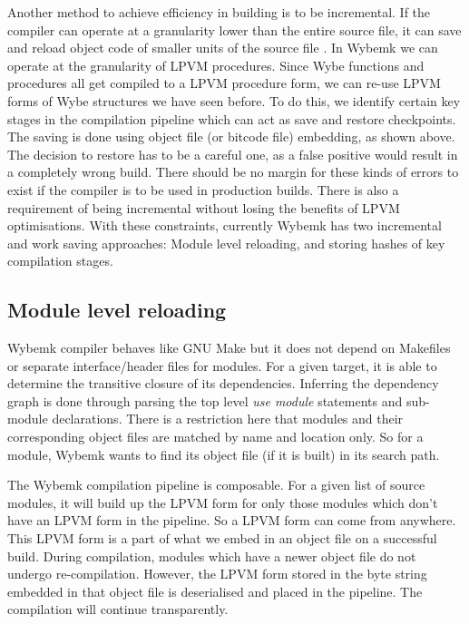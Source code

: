 Another method to achieve efficiency in building is to be incremental. If the
compiler can operate at a granularity lower than the entire source file, it can
save and reload object code of smaller units of the source file
\citep{cpp_compiler}. In Wybemk we can operate at the granularity of LPVM
procedures. Since Wybe functions and procedures all get compiled to a LPVM
procedure form, we can re-use LPVM forms of Wybe structures we have seen
before. To do this, we identify certain key stages in the compilation pipeline
which can act as save and restore checkpoints. The saving is done using object
file (or bitcode file) embedding, as shown above. The decision to restore has
to be a careful one, as a false positive would result in a completely wrong
build. There should be no margin for these kinds of errors to exist if the
compiler is to be used in production builds. There is also a requirement of
being incremental without losing the benefits of LPVM optimisations. With these
constraints, currently Wybemk has two incremental and work saving approaches:
Module level reloading, and storing hashes of key compilation stages.


\subsection{Module level reloading}
\label{sssec:moduel_reloading}

Wybemk compiler behaves like GNU Make but it does not depend on Makefiles or
separate interface/header files for modules. For a given target, it is able to
determine the transitive closure of its dependencies. Inferring the dependency
graph is done through parsing the top level \textit{use module} statements and
sub-module declarations. There is a restriction here that modules and their
corresponding object files are matched by name and location only. So for a
module, Wybemk wants to find its object file (if it is built) in its search
path.

The Wybemk compilation pipeline is composable. For a given list of source
modules, it will build up the LPVM form for only those modules which don't have
an LPVM form in the pipeline. So a LPVM form can come from anywhere. This LPVM
form is a part of what we embed in an object file on a successful build. During
compilation, modules which have a newer object file do not undergo
re-compilation. However, the LPVM form stored in the byte string embedded in
that object file is deserialised and placed in the pipeline. The compilation
will continue transparently.

